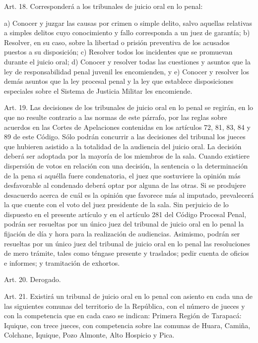     Art. 18. Corresponderá a los tribunales de juicio oral en lo penal:

    a) Conocer y juzgar las causas por crimen o simple delito, salvo aquellas relativas a simples delitos cuyo conocimiento y fallo corresponda a un juez de garantía;
    b) Resolver, en su caso, sobre la libertad o prisión preventiva de los acusados puestos a su disposición;
    c) Resolver todos los incidentes que se promuevan durante el juicio oral;
    d) Conocer y resolver todas las cuestiones y asuntos que la ley de responsabilidad penal juvenil les encomienden, y
    e) Conocer y resolver los demás asuntos que la ley procesal penal y la ley que establece disposiciones especiales sobre el Sistema de Justicia Militar les encomiende.


    Art. 19. Las decisiones de los tribunales de juicio oral en lo penal se regirán, en lo que no resulte contrario a las normas de este párrafo, por las reglas sobre acuerdos en las Cortes de Apelaciones contenidas en los artículos 72, 81, 83, 84 y 89 de este Código.
    Sólo podrán concurrir a las decisiones del tribunal los jueces que hubieren asistido a la totalidad de la audiencia del juicio oral.
    La decisión deberá ser adoptada por la mayoría de los miembros de la sala.
    Cuando existiere dispersión de votos en relación con una decisión, la sentencia o la determinación de la pena si aquélla fuere condenatoria, el juez que sostuviere la opinión más desfavorable al condenado deberá optar por alguna de las otras.
    Si se produjere desacuerdo acerca de cuál es la opinión que favorece más al imputado, prevalecerá la que cuente con el voto del juez presidente de la sala.
    Sin perjuicio de lo dispuesto en el presente artículo y en el artículo 281 del Código Procesal Penal, podrán ser resueltas por un único juez del tribunal de juicio oral en lo penal la fijación de día y hora para la realización de audiencias. Asimismo, podrán ser resueltas por un único juez del tribunal de juicio oral en lo penal las resoluciones de mero trámite, tales como téngase presente y traslados; pedir cuenta de oficios e informes; y tramitación de exhortos.

      Art. 20. Derogado.


    Art. 21. Existirá un tribunal de juicio oral en lo penal con asiento en cada una de las siguientes comunas del territorio de la República, con el número de jueces y con la competencia que en cada caso se indican:
    Primera Región de Tarapacá:
    Iquique, con trece jueces, con competencia sobre las comunas de Huara, Camiña, Colchane, Iquique, Pozo Almonte, Alto Hospicio y Pica.

